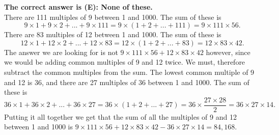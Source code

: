 \documentclass{article}
\begin{document}
\textbf{The correct answer is (E): None of these.}\\[1 ex]
There are 111 multiples of 9 between 1 and 1000.  The sum of these is
\begin{equation*}
9\times1+9\times2+...+9\times111=9\times(1+2+...+111)=9\times111\times56.
\end{equation*}
There are 83 multiples of 12 between 1 and 1000.  The sum of these is
\begin{equation*}
12\times1+12\times2+...+12\times83=12\times(1+2+...+83)=12\times83\times42.
\end{equation*}
The answer we are looking for is not $9\times111\times56+12\times83\times42$ however, since we would be adding common multiples of 9 and 12 twice. We must, therefore subtract the common multiples from the sum.  The lowest common multiple of 9 and 12 is 36, and there are 27 multiples of 36 between 1 and 1000.  The sum of these is
\begin{equation*}
36\times1+36\times2+...+36\times27=36\times(1+2+...+27)=36\times\frac{27\times28}{2}=36\times27\times14.
\end{equation*}
Putting it all together we get that the sum of all the multiples of 9 and 12 between 1 and 1000 is $9\times111\times56+12\times83\times42-36\times27\times14=84,168.$
\\[5 ex]
\end{document}
